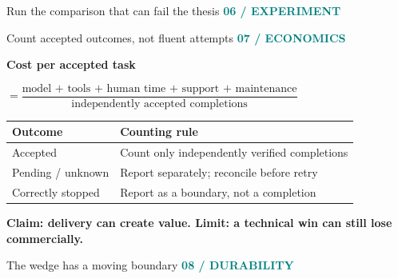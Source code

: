 \documentclass[aspectratio=169,11pt]{beamer}
\newcommand{\eyebrow}[1]{\textcolor{teal}{\textsf{\scriptsize\bfseries #1}}\par\vspace{.18cm}}
\newcommand{\takeaway}[1]{\vfill\colorbox{pale}{\parbox{.96\linewidth}{\vspace{.13cm}\small\textbf{#1}\vspace{.13cm}}}}
\newcommand{\scope}[1]{\par\vspace{.15cm}{\scriptsize #1}\par}
\providecommand{\variant}{argument}
\begin{document}
\begin{frame}[fragile]{Run the comparison that can fail the thesis}
\eyebrow{06 / EXPERIMENT}

\end{frame}

\begin{frame}{Count accepted outcomes, not fluent attempts}
\eyebrow{07 / ECONOMICS}
\begin{center}
{\large\bfseries Cost per accepted task}\par\vspace{.15cm}
{\normalsize $=\dfrac{\text{model + tools + human time + support + maintenance}}{\text{independently accepted completions}}$}
\end{center}
\vspace{.18cm}
\begin{tabular}{p{.26\linewidth}p{.65\linewidth}}
\toprule
Outcome & Counting rule\\\midrule
Accepted & Count only independently verified completions\\
Pending / unknown & Report separately; reconcile before retry\\
Correctly stopped & Report as a boundary, not a completion\\\bottomrule
\end{tabular}
\scope{No accepted completions: unit cost is undefined, not zero. Report actual spend separately from elapsed time and disclose labor rates.}
\takeaway{Claim: delivery can create value. Limit: a technical win can still lose commercially.}
\end{frame}

\begin{frame}{The wedge has a moving boundary}
\eyebrow{08 / DURABILITY}
\begin{columns}[T]
\begin{column}{.49\linewidth}
\def\SlidePlotHeight{3.6cm}\resizebox{\linewidth}{!}{}
\scope{Conceptual amortization; no measured break-even point or ROI.}
\end{column}
\begin{column}{.49\linewidth}
\def\SlidePlotHeight{3.6cm}\resizebox{\linewidth}{!}{}
\scope{Conceptual scenarios, not trajectories or forecasts.}
\end{column}
\end{columns}
\scope{Retest after provider upgrades: specialist value may persist, complement the platform, or disappear.}
\end{frame}
\end{document}

